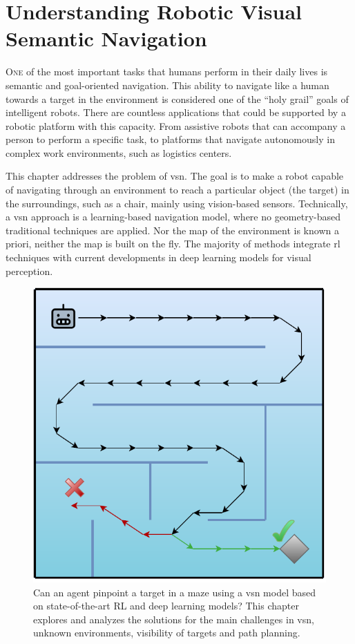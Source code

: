 \chapter{Understanding Robotic Visual Semantic Navigation}\label{ch:understanding-robotic-visual-semantic-navigation}

\lettrine{\textcolor{accent_color}{O}}{ne} of the most important tasks that humans perform in their daily lives is semantic and goal-oriented navigation.
This ability to navigate like a human towards a target in the environment is considered one of the ``holy grail'' goals of intelligent robots.
There are countless applications that could be supported by a robotic platform with this capacity.
From assistive robots that can accompany a person to perform a specific task, to platforms that navigate autonomously in complex work environments, such as logistics centers.

This chapter addresses the problem of \acrlong{vsn}.
The goal is to make a robot capable of navigating through an environment to reach a particular object (the target) in the surroundings, such as a chair, mainly using vision-based sensors.
Technically, a \acrshort{vsn} approach is a learning-based navigation model, where no geometry-based traditional techniques are applied.
Nor the map of the environment is known a priori, neither the map is built on the fly.
The majority of methods integrate \acrshort{rl} techniques with current developments in deep learning models for visual perception.

\begin{figure}
    \centering
    \includegraphics[width=0.6\linewidth]{figures/understanding_vsn/graphical_abstract}
    \caption[Diagram of target-goal navigation]{Can an agent pinpoint a target in a maze using a \acrshort{vsn} model based on state-of-the-art RL and deep learning models? This chapter explores and analyzes the solutions for the main challenges in \acrshort{vsn}, \ie unknown environments, visibility of targets and path planning.}
    \label{fig:graphical_abstract}
\end{figure}


